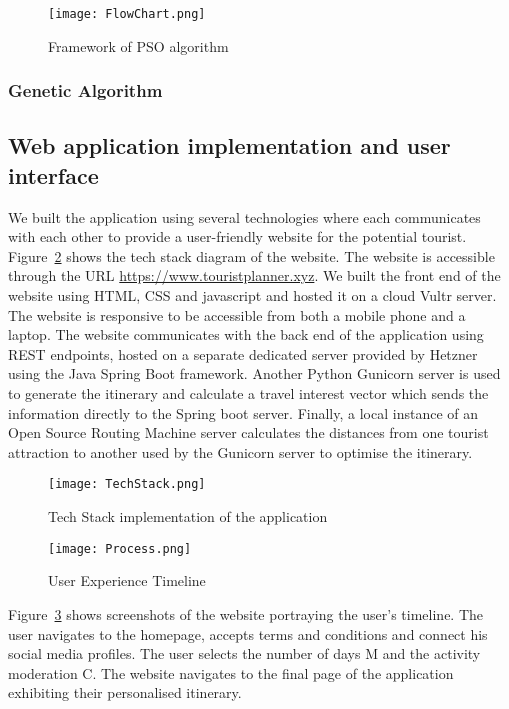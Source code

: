 \begin{figure}[h]
\centering
\texttt{[image: FlowChart.png]}
\caption{Framework of PSO algorithm}
\label{FlowChart}
\end{figure}

\subsubsection{Genetic Algorithm}

\subsection{Web application implementation and user
interface}

We built the application using several technologies
where each communicates with each other to provide a
user-friendly website for the potential tourist.
Figure~\ref{TechStack} shows the tech stack diagram of the website.
The website is accessible through the URL
\url{https://www.touristplanner.xyz}. We built the front end of the website using HTML, CSS and javascript and hosted it
on a cloud Vultr server. The website is 
responsive to be accessible from both a
mobile phone and a laptop. The website communicates
with the back end of the application using REST
endpoints, hosted on a separate dedicated server
provided by Hetzner using the Java Spring Boot
framework.  Another Python Gunicorn server is used to
generate the itinerary and calculate a travel interest
vector which sends the information directly to the
Spring boot server. Finally, a local instance of an
Open Source Routing Machine server calculates the
distances from one tourist attraction to another used
by the Gunicorn server to optimise the itinerary. 

\begin{figure}[h]
\centering
\texttt{[image: TechStack.png]}
\caption{Tech Stack implementation of the application} \label{TechStack}
\end{figure}

\begin{figure}[h]
\centering
\texttt{[image: Process.png]}
\caption{User Experience Timeline}
\label{Timeline}
\end{figure}

Figure~\ref{Timeline} shows screenshots of the website portraying
the user's timeline.  The user navigates to the
homepage, accepts terms and conditions and connect his
social media profiles.  The user selects the number of
days M and the activity moderation C.  The website
navigates to the final page of the application
exhibiting their personalised itinerary. 
